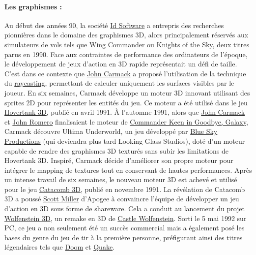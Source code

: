 \documentclass[12pt]{report}
\begin{document}
\paragraph{Les graphismes : }
Au début des années 90, la société \href{https://fr.wikipedia.org/wiki/Id_Software}{Id Software} a entrepris des 
recherches pionnières dans le domaine des graphismes 3D, alors principalement réservés aux simulateurs de vols tels 
que \href{https://fr.wikipedia.org/wiki/Wing_Commander_(jeu_vid%C3%A9o)}{Wing Commander} ou 
\href{https://en.wikipedia.org/wiki/Knights_of_the_Sky}{Knights of the Sky}, deux titres parus en 1990. Face aux 
contraintes de performance des ordinateurs de l'époque, le développement de jeux d'action en 3D rapide représentait 
un défi de taille. C'est dans ce contexte que \href{https://fr.wikipedia.org/wiki/John_Carmack}{John Carmack} a 
proposé l'utilisation de la technique du \href{https://fr.wikipedia.org/wiki/Raycasting}{raycasting}, permettant 
de calculer uniquement les surfaces visibles par le joueur. En six semaines, Carmack développe un moteur 3D innovant 
utilisant des sprites 2D pour représenter les entités du jeu. Ce moteur a été utilisé dans le jeu 
\href{https://fr.wikipedia.org/wiki/Hovertank_3D}{Hovertank 3D}, publié en avril 1991. À l'automne 1991, alors 
que \href{https://fr.wikipedia.org/wiki/John_Carmack}{John Carmack} et 
\href{https://fr.wikipedia.org/wiki/John_Romero}{John Romero} finalisaient le moteur de 
\href{https://en.wikipedia.org/wiki/Commander_Keen_in_Goodbye,_Galaxy}{Commander Keen in Goodbye, Galaxy}, Carmack 
découvre Ultima Underworld, un jeu développé par \href{https://fr.wikipedia.org/wiki/Looking_Glass_Studios}{Blue Sky 
Productions} (qui deviendra plus tard Looking Glass Studios), doté d'un moteur capable de rendre des graphismes 3D 
texturés sans subir les limitations de Hovertank 3D. Inspiré, Carmack décide d'améliorer son propre moteur pour 
intégrer le mapping de textures tout en conservant de hautes performances. Après un intense travail de six semaines, 
le nouveau moteur 3D est achevé et utilisé pour le jeu \href{https://fr.wikipedia.org/wiki/Catacomb_3D}{Catacomb 3D},
publié en novembre 1991. La révélation de Catacomb 3D a poussé 
\href{https://fr.wikipedia.org/wiki/Scott_Miller_(programmeur)}{Scott Miller} d'Apogee à convaincre l'équipe de 
développer un jeu d'action en 3D sous forme de shareware. Cela a conduit au lancement du projet 
\href{https://fr.wikipedia.org/wiki/Wolfenstein_3D}{Wolfenstein 3D}, un remake en 3D de 
\href{https://fr.wikipedia.org/wiki/Castle_Wolfenstein}{Castle Wolfenstein}. Sorti le 5 mai 1992 sur PC, ce jeu a 
non seulement été un succès commercial mais a également posé les bases du genre du jeu de tir à la première personne, 
préfigurant ainsi des titres légendaires tels que 
\href{https://fr.wikipedia.org/wiki/Doom_(jeu_vid%C3%A9o,_1993)}{Doom} et 
\href{https://fr.wikipedia.org/wiki/Quake}{Quake}.
\end{document}
